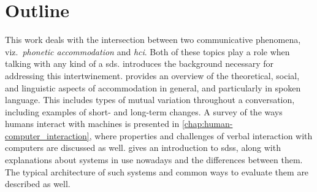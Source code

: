\newpage
\section*{Outline}
%
This work deals with the intersection between two communicative phenomena, viz.\ \emph{phonetic accommodation} and \emph{\acl{hci}}.
Both of these topics play a role when talking with any kind of a \acl{sds}.
 introduces the background necessary for addressing this intertwinement.
 provides an overview of the theoretical, social, and linguistic aspects of accommodation in general, and particularly in spoken language.
This includes types of mutual variation throughout a conversation, including examples of short- and long-term changes.
A survey of the ways humans interact with machines is presented in \cref{chap:human-computer_interaction}, where properties and challenges of verbal interaction with computers are discussed as well.
 gives an introduction to \aclp{sds}, along with explanations about systems in use nowadays and the differences between them.
The typical architecture of such systems and common ways to evaluate them are described as well.

